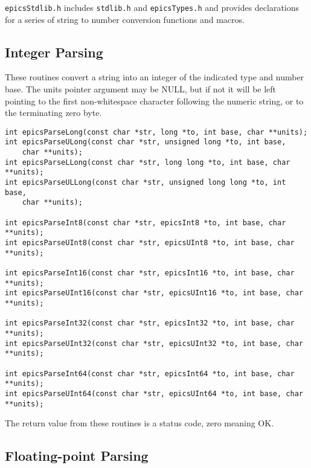 \verb|epicsStdlib.h| includes \verb|stdlib.h| and \verb|epicsTypes.h| and provides declarations for a series of string to number conversion functions and macros.

\subsection{Integer Parsing}

These routines convert a string into an integer of the indicated type and number base.
The units pointer argument may be NULL, but if not it will be left pointing to the first non-whitespace character following the numeric string, or to the terminating zero byte.

\begin{verbatim}
int epicsParseLong(const char *str, long *to, int base, char **units);
int epicsParseULong(const char *str, unsigned long *to, int base,
    char **units);
int epicsParseLLong(const char *str, long long *to, int base, char **units);
int epicsParseULLong(const char *str, unsigned long long *to, int base,
    char **units);

int epicsParseInt8(const char *str, epicsInt8 *to, int base, char **units);
int epicsParseUInt8(const char *str, epicsUInt8 *to, int base, char **units);

int epicsParseInt16(const char *str, epicsInt16 *to, int base, char **units);
int epicsParseUInt16(const char *str, epicsUInt16 *to, int base, char **units);

int epicsParseInt32(const char *str, epicsInt32 *to, int base, char **units);
int epicsParseUInt32(const char *str, epicsUInt32 *to, int base, char **units);

int epicsParseInt64(const char *str, epicsInt64 *to, int base, char **units);
int epicsParseUInt64(const char *str, epicsUInt64 *to, int base, char **units);
\end{verbatim}

The return value from these routines is a status code, zero meaning OK.

\subsection{Floating-point Parsing}

